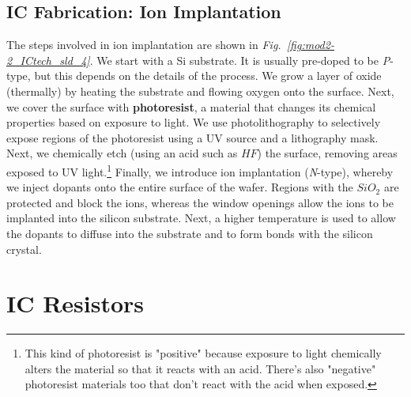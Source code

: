 \subsection{IC Fabrication: Ion Implantation}
The steps involved in ion implantation are shown in \emph{Fig.~\ref{fig:mod2-2_ICtech_sld_4}}.  We start with a Si substrate.  It is usually pre-doped to be \emph{P}-type, but this depends on the details of the process.  We grow a layer of oxide (thermally) by heating the substrate and flowing oxygen onto the surface.  Next, we cover the surface with \textbf{photoresist}, a material that changes its chemical properties based on exposure to light.  We use photolithography to selectively expose regions of the photoresist using a UV source and a lithography mask.  Next, we chemically etch (using an acid such as $HF$)  the surface, removing areas exposed to UV light.\footnote{This kind of photoresist is "positive" because exposure to light chemically alters the material so that it reacts with an acid. There's also  "negative" photoresist materials too that don't react with the acid when exposed.}  Finally, we introduce ion implantation (\emph{N}-type), whereby we inject dopants onto the entire surface of the wafer.  Regions with the $SiO_2$ are protected and block the ions, whereas the window openings allow the ions to be implanted into the silicon substrate.  Next, a higher temperature is used to allow the dopants to diffuse into the substrate and to form bonds with the silicon crystal.
\section{IC Resistors}
